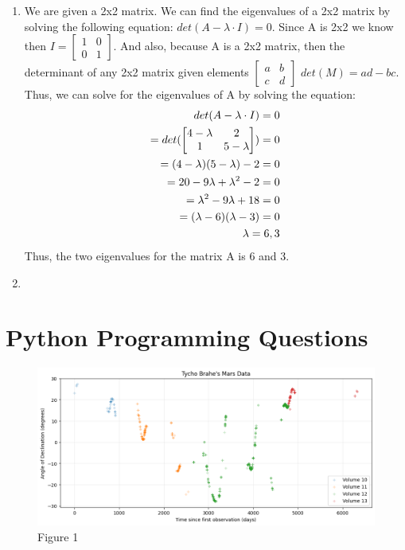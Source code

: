 \documentclass[12pt]{article}
\begin{document}
\begin{enumerate}
\begin{enumerate}
    \item 
      We are given a 2x2 matrix. We can find the eigenvalues of a 2x2 matrix by solving the following equation: 
      $det(A- \lambda \cdot I) = 0$. Since A is 2x2 we know then $I = \begin{bmatrix} 1 & 0 \\ 0 & 1 \end{bmatrix}$. And also, 
      because A is a 2x2 matrix, then the determinant of any 2x2 matrix given elements $ \begin{bmatrix} a & b \\ c & d \end{bmatrix}$ 
      $det(M) = ad-bc$. Thus, we can solve for the eigenvalues of A by solving the equation: \\ 
      \begin{align}
        det(A - \lambda \cdot I) = 0 \notag \\ 
       = det(\begin{bmatrix} 4-\lambda & 2 \\ 1 & 5-\lambda \end{bmatrix}) = 0 \notag \\
        = (4-\lambda)(5-\lambda) - 2 = 0 \notag \\ 
        = 20 - 9 \lambda + \lambda^{2} - 2 = 0 \notag \\ 
        = \lambda^2 - 9\lambda + 18 = 0 \notag \\ 
        = (\lambda - 6)(\lambda - 3) = 0 \notag \\ 
        \lambda = 6, 3 \notag
      \end{align}
     Thus, the two eigenvalues for the matrix A is 6 and 3. 
    \item  
 \end{enumerate}
\end{enumerate}

\section{Python Programming Questions}

  \begin{figure}[H]
      \centering
      \includegraphics[width=\textwidth]{fig1.png}
      \caption{Figure 1}
      \label{fig:fig1}
  \end{figure}
\end{document}

